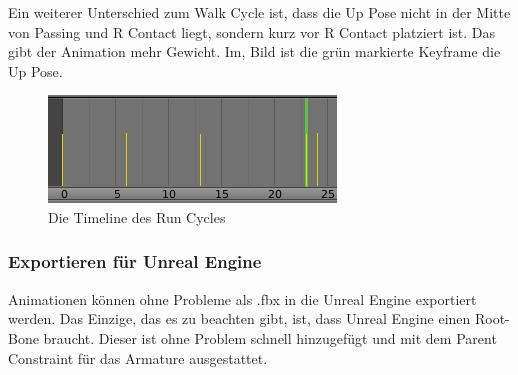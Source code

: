 Ein weiterer Unterschied zum Walk Cycle ist, dass die Up Pose nicht in der Mitte von Passing und R Contact liegt,
sondern kurz vor R Contact platziert ist. Das gibt der Animation mehr Gewicht. Im, Bild ist die grün markierte Keyframe die Up Pose.

\begin{figure}[H]
    \centering

    \includegraphics[width=.8\textwidth]{images/animation_run_an_timeline.png}
    \caption{Die Timeline des Run Cycles}
\end{figure}

\subsubsection{Exportieren für Unreal Engine}
Animationen können ohne Probleme als .fbx in die Unreal Engine exportiert werden. Das Einzige, das es zu beachten gibt, ist,
dass Unreal Engine einen Root-Bone braucht. Dieser ist ohne Problem schnell hinzugefügt und mit dem Parent Constraint für das Armature ausgestattet.
